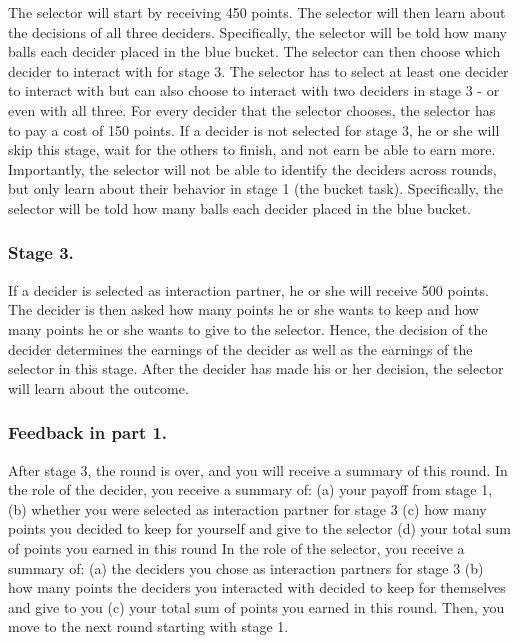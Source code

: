 \documentclass[man]{apa6}
\begin{document}
The selector will start by receiving 450 points. The selector will then
learn about the decisions of all three deciders. Specifically, the
selector will be told how many balls each decider placed in the blue
bucket. The selector can then choose which decider to interact with for
stage 3. The selector has to select at least one decider to interact
with but can also choose to interact with two deciders in stage 3 - or
even with all three. For every decider that the selector chooses, the
selector has to pay a cost of 150 points. If a decider is not selected
for stage 3, he or she will skip this stage, wait for the others to
finish, and not earn be able to earn more. Importantly, the selector
will not be able to identify the deciders across rounds, but only learn
about their behavior in stage 1 (the bucket task). Specifically, the
selector will be told how many balls each decider placed in the blue
bucket.

\hypertarget{stage-3.}{%
\subsubsection{Stage 3.}\label{stage-3.}}

If a decider is selected as interaction partner, he or she will receive
500 points. The decider is then asked how many points he or she wants to
keep and how many points he or she wants to give to the selector. Hence,
the decision of the decider determines the earnings of the decider as
well as the earnings of the selector in this stage. After the decider
has made his or her decision, the selector will learn about the outcome.

\hypertarget{feedback-in-part-1.}{%
\subsubsection{Feedback in part 1.}\label{feedback-in-part-1.}}

After stage 3, the round is over, and you will receive a summary of this
round. In the role of the decider, you receive a summary of: (a) your
payoff from stage 1, (b) whether you were selected as interaction
partner for stage 3 (c) how many points you decided to keep for yourself
and give to the selector (d) your total sum of points you earned in this
round In the role of the selector, you receive a summary of: (a) the
deciders you chose as interaction partners for stage 3 (b) how many
points the deciders you interacted with decided to keep for themselves
and give to you (c) your total sum of points you earned in this round.
Then, you move to the next round starting with stage 1.
\end{document}
